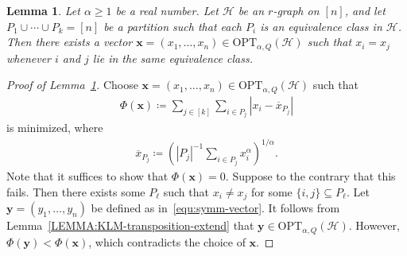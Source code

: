 \documentclass[11pt,a4paper]{article}
\newtheorem{lemma}[definition]{Lemma}
\begin{document}
\begin{lemma}\label{LEMMA:KLM-equivalence-classes-extend}
    Let $\alpha \ge 1$ be a real number. Let $\mathcal{H}$ be an $r$-graph on $[n]$, and let $P_1 \cup \cdots \cup P_k = [n]$ be a partition such that each $P_i$ is an equivalence class in $\mathcal{H}$. Then there exists a vector $\mathbf{x} = (x_1, \ldots, x_n) \in \mathrm{OPT}_{\alpha, Q}(\mathcal{H})$ such that $x_i = x_j$ whenever $i$ and $j$ lie in the same equivalence class.
\end{lemma}
\begin{proof}[Proof of Lemma~\ref{LEMMA:KLM-equivalence-classes-extend}]
    Choose $\mathbf{x} = (x_1, \ldots, x_n) \in \mathrm{OPT}_{\alpha, Q}(\mathcal{H})$ such that 
    \begin{align*}
        \Phi(\mathbf{x})
        \coloneqq \sum_{j\in [k]} \sum_{i \in P_j} \left| x_i - \overline{x}_{P_j}\right|
    \end{align*}
    is minimized, where 
    \begin{align*}
        \overline{x}_{P_j}
        \coloneqq \left(|P_j|^{-1} \sum_{i \in P_j} x_i^{\alpha}\right)^{1/\alpha}. 
    \end{align*}
    Note that it suffices to show that $\Phi(\mathbf{x}) = 0$. Suppose to the contrary that this fails. 
    Then there exists some $P_{\ell}$ such that $x_i \neq x_j$ for some $\{i,j\} \subseteq P_{\ell}$. 
    Let $\mathbf{y} = (y_1, \ldots, y_n)$ be defined as in~\eqref{equ:symm-vector}. 
    It follows from Lemma~\ref{LEMMA:KLM-transposition-extend} that $\mathbf{y} \in \mathrm{OPT}_{\alpha, Q}(\mathcal{H})$. 
    However, $\Phi(\mathbf{y}) < \Phi(\mathbf{x})$, which contradicts the choice of $\mathbf{x}$.
\end{proof}
\end{document}
